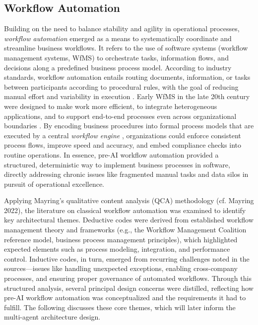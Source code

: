 \subsection{Workflow Automation}\label{subsec:workflow-auto}
Building on the need to balance stability and agility in operational processes, \textit{workflow automation} emerged as a means to systematically coordinate and streamline business workflows. It refers to the use of software systems (workflow management systems, WfMS) to orchestrate tasks, information flows, and decisions along a predefined business process model. According to industry standards, workflow automation entails routing documents, information, or tasks between participants according to procedural rules, with the goal of reducing manual effort and variability in execution \citep{basuResearch2002}. Early WfMS in the late 20th century were designed to make work more efficient, to integrate heterogeneous applications, and to support end-to-end processes even across organizational boundaries \citep{stohrWorkflow2001}. By encoding business procedures into formal process models that are executed by a central \textit{workflow engine} \citep{basuResearch2002}, organizations could enforce consistent process flows, improve speed and accuracy, and embed compliance checks into routine operations. In essence, pre-AI workflow automation provided a structured, deterministic way to implement business processes in software, directly addressing chronic issues like fragmented manual tasks and data silos in pursuit of operational excellence.

Applying Mayring’s qualitative content analysis (QCA) methodology (cf. Mayring 2022), the literature on classical workflow automation was examined to identify key architectural themes. Deductive codes were derived from established workflow management theory and frameworks (e.g., the Workflow Management Coalition reference model, business process management principles), which highlighted expected elements such as process modeling, integration, and performance control. Inductive codes, in turn, emerged from recurring challenges noted in the sources—issues like handling unexpected exceptions, enabling cross-company processes, and ensuring proper governance of automated workflows. Through this structured analysis, several principal design concerns were distilled, reflecting how pre-AI workflow automation was conceptualized and the requirements it had to fulfill. The following discusses these core themes, which will later inform the multi-agent architecture design.

